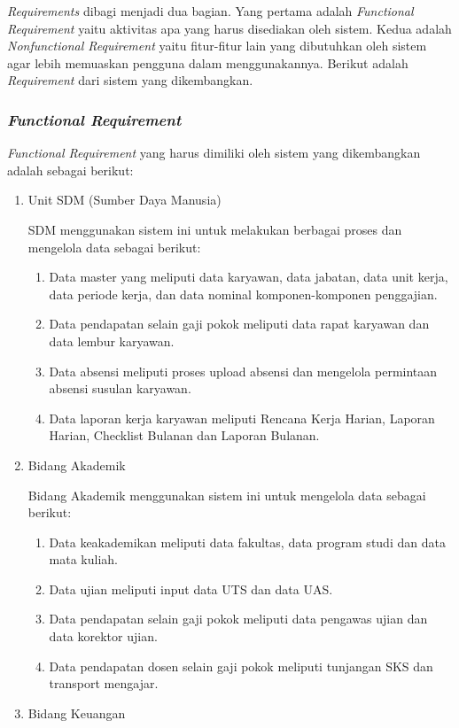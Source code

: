 			\emph{Requirements} dibagi menjadi dua bagian. Yang pertama adalah \emph{Functional Requirement} yaitu aktivitas apa yang harus disediakan oleh sistem. Kedua adalah \emph{Nonfunctional Requirement} yaitu fitur-fitur lain yang dibutuhkan oleh sistem agar lebih memuaskan pengguna dalam menggunakannya. Berikut adalah \emph{Requirement} dari sistem yang dikembangkan.

			\subsubsection{\emph{Functional Requirement}}
				\emph{Functional Requirement} yang harus dimiliki oleh sistem yang dikembangkan adalah sebagai berikut:
				\begin{enumerate}
					\itemsep0em
					\item Unit SDM (Sumber Daya Manusia)
					
						SDM menggunakan sistem ini untuk melakukan berbagai proses dan mengelola data sebagai berikut:
						\begin{enumerate}[label=\alph*.]
							\itemsep0em
							\item Data master yang meliputi data karyawan, data jabatan, data unit kerja, data periode kerja, dan data nominal komponen-komponen penggajian.
							\item Data pendapatan selain gaji pokok meliputi data rapat karyawan dan data lembur karyawan.
							\item Data absensi meliputi proses upload absensi dan mengelola permintaan absensi susulan karyawan.
							\item Data laporan kerja karyawan meliputi Rencana Kerja Harian, Laporan Harian, Checklist Bulanan dan Laporan Bulanan.
						\end{enumerate}
					\item Bidang Akademik
					
						Bidang Akademik menggunakan sistem ini untuk mengelola data sebagai berikut:
						\begin{enumerate}[label=\alph*.]
							\itemsep0em
							\item Data keakademikan meliputi data fakultas, data program studi dan data mata kuliah.
							\item Data ujian meliputi input data UTS dan data UAS.
							\item Data pendapatan selain gaji pokok meliputi data pengawas ujian dan data korektor ujian.
							\item Data pendapatan dosen selain gaji pokok meliputi tunjangan SKS dan transport mengajar.
						\end{enumerate}
					\item Bidang Keuangan
					

\end{enumerate}
